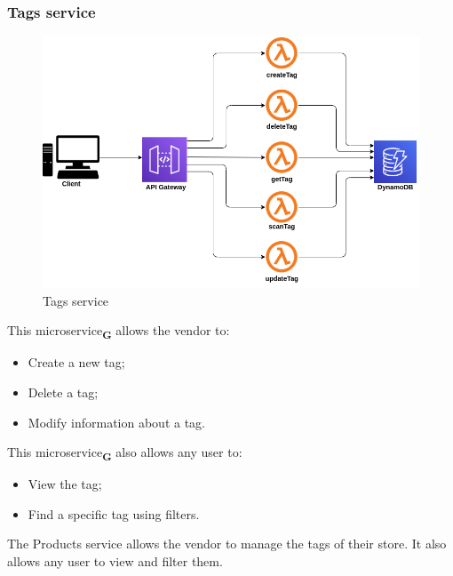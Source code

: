 \subsubsection{Tags service}
\begin{figure}[!h]
    \vspace{5px}
    \includegraphics[scale=0.5]{../../../../Images/Diagrammi/maintainerManual/tagsService.png}
    \centering
    \caption{Tags service}
\end{figure}
This microservice\textsubscript{\textbf{G}} allows the vendor to:
\begin{itemize}
    \item Create a new tag;
    \item Delete a tag;
    \item Modify information about a tag.
\end{itemize}
This microservice\textsubscript{\textbf{G}} also allows any user to:
\begin{itemize}
    \item View the tag;
    \item Find a specific tag using filters.
\end{itemize}
The Products service allows the vendor to manage the tags of their store. It also allows any user to view and filter them.
\pagebreak
